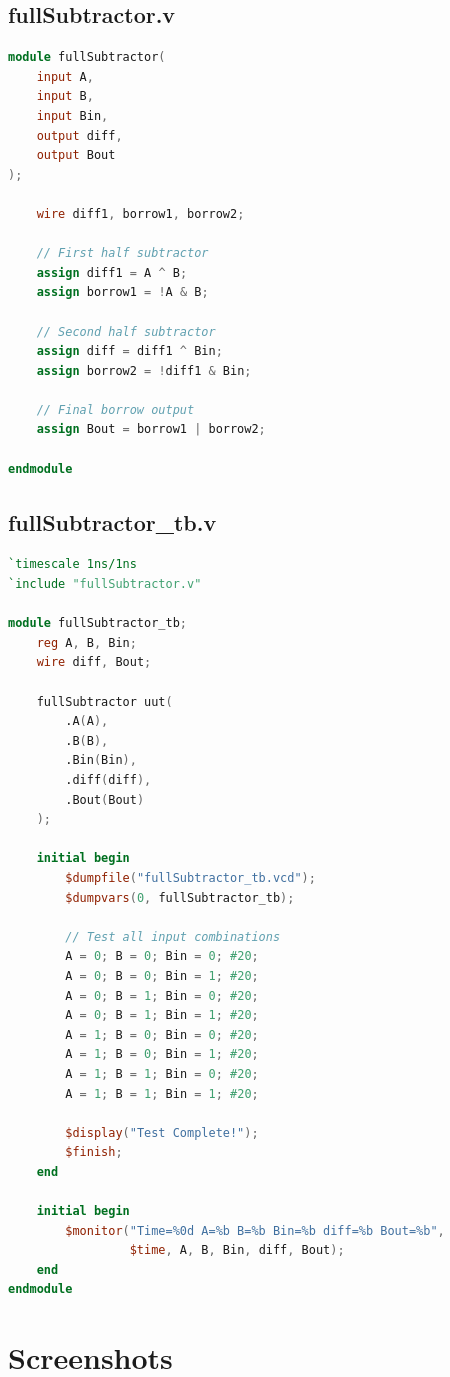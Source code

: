 \documentclass[a4paper,12pt]{article}
\begin{document}
\newpage

\subsection*{fullSubtractor.v}
\begin{lstlisting}[language=Verilog]
module fullSubtractor(
    input A,
    input B,
    input Bin,
    output diff,
    output Bout
);
    
    wire diff1, borrow1, borrow2;
    
    // First half subtractor
    assign diff1 = A ^ B;
    assign borrow1 = !A & B;
    
    // Second half subtractor
    assign diff = diff1 ^ Bin;
    assign borrow2 = !diff1 & Bin;
    
    // Final borrow output
    assign Bout = borrow1 | borrow2;

endmodule
\end{lstlisting}

\newpage

\subsection*{fullSubtractor\_tb.v}
\begin{lstlisting}[language=Verilog]
`timescale 1ns/1ns
`include "fullSubtractor.v"

module fullSubtractor_tb;
    reg A, B, Bin;
    wire diff, Bout;
    
    fullSubtractor uut(
        .A(A),
        .B(B),
        .Bin(Bin),
        .diff(diff),
        .Bout(Bout)
    );
    
    initial begin
        $dumpfile("fullSubtractor_tb.vcd");
        $dumpvars(0, fullSubtractor_tb);
        
        // Test all input combinations
        A = 0; B = 0; Bin = 0; #20;
        A = 0; B = 0; Bin = 1; #20;
        A = 0; B = 1; Bin = 0; #20;
        A = 0; B = 1; Bin = 1; #20;
        A = 1; B = 0; Bin = 0; #20;
        A = 1; B = 0; Bin = 1; #20;
        A = 1; B = 1; Bin = 0; #20;
        A = 1; B = 1; Bin = 1; #20;
        
        $display("Test Complete!");
        $finish;
    end
    
    initial begin
        $monitor("Time=%0d A=%b B=%b Bin=%b diff=%b Bout=%b",
                 $time, A, B, Bin, diff, Bout);
    end
endmodule
\end{lstlisting}

\section*{Screenshots}
\end{document}
